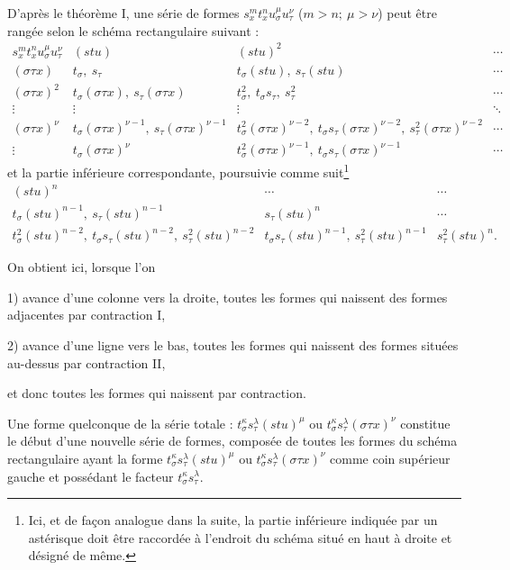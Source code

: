 \documentclass[11pt]{article}
\begin{document}
D'après le théorème I, une série de formes $s_x^m t_x^n u_\sigma^\mu u_\tau^\nu$ ($m>n;\ \mu>\nu$) peut être rangée selon le schéma rectangulaire suivant :
\begingroup\small
\[
\begin{array}{c|c|c|c}
s_x^m t_x^n u_\sigma^\mu u_\tau^\nu
& (stu)
& (stu)^2
& \cdots\\[0.3em]
(\sigma\tau x)
& t_\sigma,\ s_\tau
& t_\sigma(stu),\ s_\tau(stu)
& \cdots\\[0.3em]
(\sigma\tau x)^2
& t_\sigma(\sigma\tau x),\ s_\tau(\sigma\tau x)
& t_\sigma^2,\ t_\sigma s_\tau,\ s_\tau^2
& \cdots\\[0.3em]
\vdots&\vdots&\vdots&\ddots\\[0.3em]
(\sigma\tau x)^\nu
& t_\sigma(\sigma\tau x)^{\nu-1},\ s_\tau(\sigma\tau x)^{\nu-1}
& t_\sigma^2(\sigma\tau x)^{\nu-2},\ t_\sigma s_\tau(\sigma\tau x)^{\nu-2},\ s_\tau^2(\sigma\tau x)^{\nu-2}
& \cdots\\[0.3em]
\vdots
& t_\sigma(\sigma\tau x)^\nu
& t_\sigma^2(\sigma\tau x)^{\nu-1},\ t_\sigma s_\tau(\sigma\tau x)^{\nu-1}
& \cdots
\end{array}
\]
\endgroup
et la partie inférieure correspondante, poursuivie comme suit\footnote{Ici, et de façon analogue dans la suite, la partie inférieure indiquée par un astérisque doit être raccordée à l'endroit du schéma situé en haut à droite et désigné de même.}
\begingroup\small
\[
\begin{array}{c|c|c}
(stu)^n & \cdots & \cdots\\[0.3em]
t_\sigma(stu)^{n-1},\ s_\tau(stu)^{n-1}
& s_\tau(stu)^n & \cdots\\[0.3em]
t_\sigma^2(stu)^{n-2},\ t_\sigma s_\tau(stu)^{n-2},\ s_\tau^2(stu)^{n-2}
& t_\sigma s_\tau(stu)^{n-1},\ s_\tau^2(stu)^{n-1}
& s_\tau^2(stu)^n .
\end{array}
\]
\endgroup

On obtient ici, lorsque l'on

1) avance d'une colonne vers la droite, toutes les formes qui naissent des formes adjacentes par contraction I,

2) avance d'une ligne vers le bas, toutes les formes qui naissent des formes situées au-dessus par contraction II,

et donc toutes les formes qui naissent par contraction.

Une forme quelconque de la série totale : $t_\sigma^\kappa s_\tau^\lambda(stu)^\mu$ ou $t_\sigma^\kappa s_\tau^\lambda(\sigma\tau x)^\nu$ constitue le début d'une nouvelle série de formes, composée de toutes les formes du schéma rectangulaire ayant la forme $t_\sigma^\kappa s_\tau^\lambda(stu)^\mu$ ou $t_\sigma^\kappa s_\tau^\lambda(\sigma\tau x)^\nu$ comme coin supérieur gauche et possédant le facteur $t_\sigma^\kappa s_\tau^\lambda$.
\end{document}
